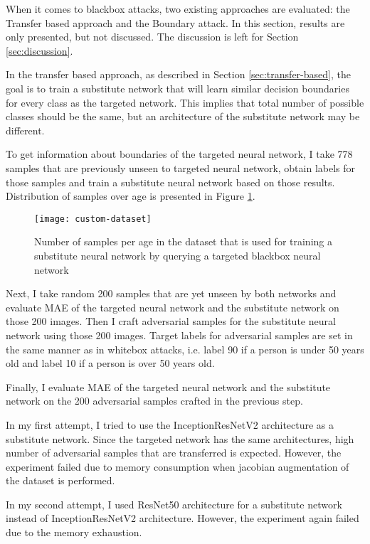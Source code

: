 When it comes to blackbox attacks, two existing approaches are evaluated: the Transfer based approach and the Boundary attack. In this section, results are only presented, but not discussed. The discussion is left for Section \ref{sec:discussion}.

In the transfer based approach, as described in Section \ref{sec:transfer-based}, the goal is to train a substitute network that will learn similar decision boundaries for every class as the targeted network. This implies that total number of possible classes should be the same, but an architecture of the substitute network may be different.

To get information about boundaries of the targeted neural network,  I take 778 samples that are previously unseen to targeted neural network, obtain labels for those samples and train a substitute neural network based on those results. Distribution of samples over age is presented in Figure \ref{fig:custom-dataset}.
 
 \begin{figure}[h]
\texttt{[image: custom-dataset]}
\caption{Number of samples per age in the dataset that is used for training a substitute neural network by querying a targeted blackbox neural network}
\label{fig:custom-dataset}
\end{figure}

Next, I take random 200 samples that are yet unseen by both networks and evaluate MAE of the targeted neural network and the substitute network on those 200 images. Then I craft adversarial samples for the substitute neural network using those 200 images. Target labels for adversarial samples are set in the same manner as in whitebox attacks, i.e. label 90 if a person is under 50 years old and label 10 if a person is over 50 years old. 

Finally, I evaluate MAE of the targeted neural network and the substitute network on the 200 adversarial samples crafted in the previous step.


In my first attempt, I tried to use the InceptionResNetV2 architecture as a substitute network. Since the targeted network has the same architectures, high number of adversarial samples that are transferred is expected. However, the experiment failed due to memory consumption when jacobian augmentation of the dataset is performed. 

In my second attempt, I used ResNet50 architecture for a substitute network instead of InceptionResNetV2 architecture. However, the experiment again failed  due to the memory exhaustion. 

